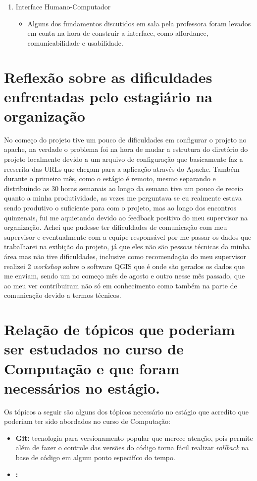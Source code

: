 \documentclass{ufscar}
\begin{document}
\begin{enumerate}
  \item Interface Humano-Computador
  \begin{itemize}
    \item Alguns dos fundamentos discutidos em sala pela professora foram levados em conta na hora de construir a interface, como affordance, comunicabilidade e usabilidade.
  \end{itemize}

\end{enumerate}

\section{Reflexão sobre as dificuldades enfrentadas pelo estagiário na organização}
No começo do projeto tive um pouco de dificuldades em configurar o projeto no apache, na verdade o problema foi na hora de mudar a estrutura do diretório do projeto localmente devido a um arquivo de configuração que basicamente faz a reescrita das URLs que chegam para a aplicação através do Apache. Também durante o primeiro mês, como o estágio é remoto, mesmo separando e distribuindo as 30 horas semanais ao longo da semana tive um pouco de receio quanto a minha produtividade, as vezes me perguntava se eu realmente estava sendo produtivo o suficiente para com o projeto, mas ao longo dos encontros quinzenais, fui me aquietando devido ao feedback positivo do meu supervisor na organização.
Achei que pudesse ter dificuldades de comunicação com meu supervisor e eventualmente com a equipe responsável por me passar os dados que trabalharei na exibição do projeto, já que eles não são pessoas técnicas da minha área mas não tive dificuldades, inclusive como recomendação do meu supervisor realizei 2 \textit{workshop} sobre o software QGIS que é onde são gerados os dados que me enviam, sendo um no começo mês de agosto e outro nesse mês passado, que ao meu ver contribuiram não só em conhecimento como também na parte de comunicação devido a termos técnicos.

\section{Relação de tópicos que poderiam ser estudados no curso de Computação e que foram necessários no estágio.}
Os tópicos a seguir são alguns dos tópicos necessário no estágio que acredito que poderiam ter sido abordados no curso de Computação:
\begin{itemize}
  \item \textbf{Git:} tecnologia para versionamento popular que merece atenção, pois permite além de fazer o controle das versões do código torna fácil realizar \textit{rollback} na base de código em algum ponto especifíco do tempo.
  \item \textbf{:}
\end{itemize}
\end{document}
